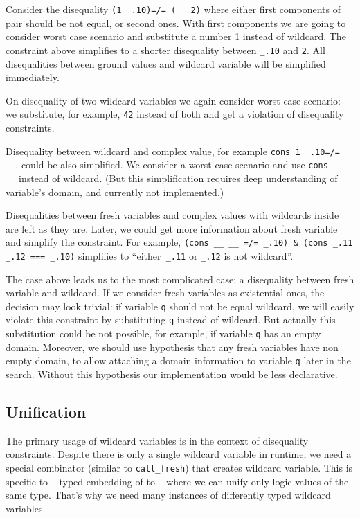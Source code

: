 Consider the disequality \lstinline|(1 _.10)=/= (__ 2)| where either first components of pair should be not equal, or second ones. With first components we are going to consider worst case scenario and substitute a number 1 instead of wildcard. The constraint above simplifies to a shorter disequality between  \lstinline|_.10| and \lstinline|2|. All disequalities between ground values and wildcard variable will be simplified immediately.

On disequality of two wildcard variables we again consider worst case scenario: we substitute, for example, \lstinline|42| instead of both and get a violation of disequality constraints.

Disequality between wildcard and complex value, for example  \lstinline|cons 1 _.10=/= __|, could be also simplified. We consider a worst case scenario and use \lstinline|cons __ __| instead of wildcard. (But this simplification requires deep understanding of variable's domain, and currently not implemented.)

Disequalities between fresh variables and complex values with wildcards inside are left as they are. Later, we could get more information  about fresh variable and simplify the constraint. For example,
 \lstinline|(cons __ __ =/= _.10) & (cons _.11 _.12 === _.10)| simplifies to ``either\lstinline| _.11|  or \lstinline|_.12| is not wildcard''.

The case above leads us to the most complicated case: a disequality between fresh variable and wildcard. If we consider fresh variables as existential ones, the decision may look trivial: if variable \lstinline|q| should not be equal wildcard, we will easily violate this constraint by substituting \lstinline|q| instead of wildcard. But actually this substitution could be not possible, for example, if variable \lstinline|q| has an empty domain. Moreover, we should use hypothesis that any fresh variables have non empty domain, to allow attaching a domain information to variable \lstinline|q| later in the search. Without this hypothesis our \miniKanren{} implementation would be less declarative.



\subsection{Unification}
The primary usage of wildcard variables is in the context of disequality constraints. 
Despite there is only a single wildcard variable in runtime, we  need a special combinator (similar to \lstinline|call_fresh|) that creates wildcard variable. 
This is specific to \OCanren{} -- typed embedding of \miniKanren{} to \OCaml{} -- where we can unify only logic values of the same type. That's why we need many instances of differently typed wildcard variables.

